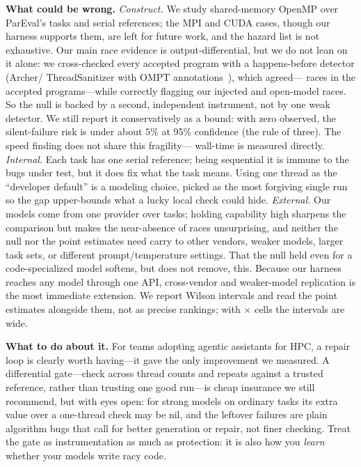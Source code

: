 \vspace{3pt}
\noindent\textbf{What could be wrong.}
\emph{Construct.} We study shared-memory OpenMP over ParEval's tasks and serial references; the
MPI and CUDA cases, though our harness supports them, are left for future work, and the hazard
list is not exhaustive. Our main race evidence is output-differential, but we do not lean on it
alone: we cross-checked every accepted program with a happens-before detector (Archer/
ThreadSanitizer with OMPT annotations~\cite{archer,tsan}), which agreed---\NsanRaces{} races in
the \NsanTimed{} accepted programs---while correctly flagging our injected and open-model races.
So the null is backed by a second, independent instrument, not by one weak detector. We still
report it conservatively as a bound: with zero observed, the silent-failure risk is under about
$5\%$ at 95\% confidence (the rule of three). The speed finding does not share this fragility---
wall-time is measured directly.
\emph{Internal.} Each task has one serial reference; being sequential it is immune to the bugs
under test, but it does fix what the task means. Using one thread as the ``developer default''
is a modeling choice, picked as the most forgiving single run so the gap upper-bounds what a
lucky local check could hide.
\emph{External.} Our \Nmodels{} models come from one provider over \Ntasks{} tasks; holding
capability high sharpens the comparison but makes the near-absence of races unsurprising, and
neither the null nor the point estimates need carry to other vendors, weaker models, larger task
sets, or different prompt/temperature settings. That the null held even for a code-specialized
model softens, but does not remove, this. Because our harness reaches any model through one API,
cross-vendor and weaker-model replication is the most immediate extension. We report Wilson
intervals and read the point estimates alongside them, not as precise rankings; with
\Nmodels{}$\times$\Ntasks{} cells the intervals are wide.

\vspace{3pt}
\noindent\textbf{What to do about it.}
For teams adopting agentic assistants for HPC, a repair loop is clearly worth having---it gave
the only improvement we measured. A differential gate---check across thread counts and repeats
against a trusted reference, rather than trusting one good run---is cheap insurance we still
recommend, but with eyes open: for strong models on ordinary tasks its extra value over a
one-thread check may be nil, and the leftover failures are plain algorithm bugs that call for
better generation or repair, not finer checking. Treat the gate as instrumentation as much as
protection: it is also how you \emph{learn} whether your models write racy code.
